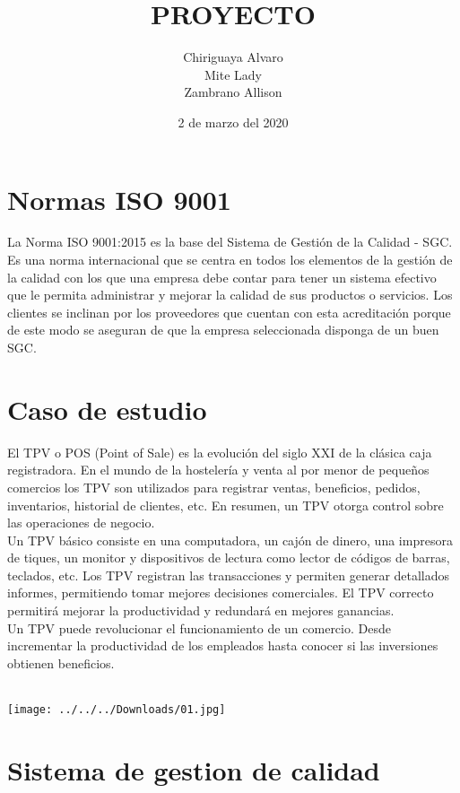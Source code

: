 \documentclass[12pt,a4paper]{article}
\title{PROYECTO}
\author{Chiriguaya Alvaro\\Mite Lady\\Zambrano Allison}
\date{2 de marzo del 2020}
\begin{document}
\maketitle

\section{Normas ISO 9001}
La Norma ISO 9001:2015 es la base del Sistema de Gestión de la Calidad - SGC. Es una norma internacional que se centra en todos los elementos de la gestión de la calidad con los que una empresa debe contar para tener un sistema efectivo que le permita administrar y mejorar la calidad de sus productos o servicios. 
Los clientes se inclinan por los proveedores que cuentan con esta acreditación porque de este modo se aseguran de que la empresa seleccionada disponga de un buen SGC.

\section{Caso de estudio}
El TPV o POS (Point of Sale) es la evolución del siglo XXI de la clásica caja registradora. En el mundo de la hostelería y venta al por menor de pequeños comercios los TPV son utilizados para registrar ventas, beneficios, pedidos, inventarios, historial de clientes, etc. En resumen, un TPV otorga control sobre las operaciones de negocio.\\
Un TPV básico consiste en una computadora, un cajón de dinero, una impresora de tiques, un monitor y dispositivos de lectura como lector de códigos de barras, teclados, etc. Los TPV registran las transacciones y permiten generar detallados informes, permitiendo tomar mejores decisiones comerciales. El TPV correcto permitirá mejorar la productividad y redundará en mejores ganancias.\\
Un TPV puede revolucionar el funcionamiento de un comercio. Desde incrementar la productividad de los empleados hasta conocer si las inversiones obtienen beneficios.\\\\
\begin{center}
\texttt{[image: ../../../Downloads/01.jpg]} 
\end{center}

\section{Sistema de gestion de calidad}
\end{document}
